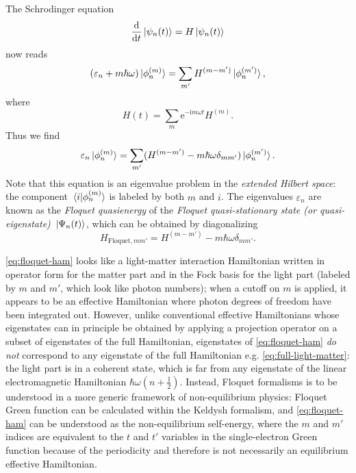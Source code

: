 \documentclass[hyperref, a4paper]{article}
\newcommand*{\ii}{\mathrm{i}}
\newcommand*{\ee}{\mathrm{e}}
\begin{document}
The Schrodinger equation 
\begin{equation}
    \dv{t} \ket*{\psi_n(t)} = H \ket*{\psi_n(t)}
\end{equation}
now reads 
\begin{equation}
    (\varepsilon_n + m \hbar \omega) \ket*{\phi_n^{(m)}} 
    = \sum_{m'} H^{(m - m')} \ket*{\phi_n^{(m')}},
\end{equation}
where 
\begin{equation}
    H(t) = \sum_{m} \ee^{- \ii m \omega t} H^{(m)}.
\end{equation}
Thus we find 
\begin{equation}
    \varepsilon_n \ket*{\phi^{(m)}_n}
    = \sum_{m'} (
        H^{(m - m')} - m \hbar \omega \delta_{m m'}
    ) \ket*{\phi^{(m')}_{n}}.
    \label{eq:floquet-ham-eigen}
\end{equation}
Note that this equation is an eigenvalue problem in the \emph{extended Hilbert space}:
the component $\braket*{i}{\phi_n^{(m)}}$ is labeled by both $m$ and $i$.
The eigenvalues $\varepsilon_n$ are known as the \emph{Floquet quasienergy} of 
the \emph{Floquet quasi-stationary state (or quasi-eigenstate)} $\ket*{\Psi_n(t)}$,
which can be obtained by diagonalizing 
\begin{equation}
    H_{\text{Floquet}, mm'} = H^{(m - m')} - m \hbar \omega \delta_{m m'}.
    \label{eq:floquet-ham}
\end{equation}

\eqref{eq:floquet-ham} looks like a light-matter interaction Hamiltonian 
written in operator form for the matter part 
and in the Fock basis for the light part (labeled by $m$ and $m'$, which look like photon numbers);
when a cutoff on $m$ is applied, 
it appears to be an effective Hamiltonian where photon degrees of freedom 
have been integrated out.
However, unlike conventional effective Hamiltonians
whose eigenstates can in principle be obtained by 
applying a projection operator on a subset of eigenstates of the full Hamiltonian,
eigenstates of \eqref{eq:floquet-ham} 
\emph{do not} correspond to any eigenstate of 
the full Hamiltonian e.g. \eqref{eq:full-light-matter}:
the light part is in a coherent state,
which is far from any eigenstate of the linear electromagnetic Hamiltonian $\hbar \omega (n + \frac{1}{2})$.
Instead, Floquet formalisms is to be understood in a more generic framework of non-equilibrium physics:
Floquet Green function can be calculated within the Keldysh formalism,
and \eqref{eq:floquet-ham} can be understood as the 
non-equilibrium self-energy, where the $m$ and $m'$ indices are equivalent to the $t$ and $t'$ variables in the single-electron Green function because of the periodicity \cite{lubatsch2019evolution,aoki2014nonequilibrium}
and therefore is not necessarily an equilibrium effective Hamiltonian.
\end{document}
